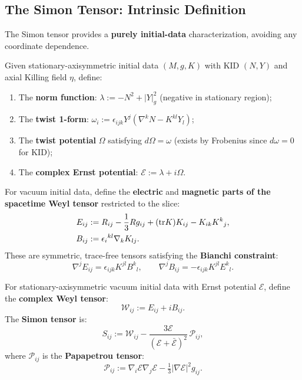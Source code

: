 \subsection{The Simon Tensor: Intrinsic Definition}

The Simon tensor provides a \textbf{purely initial-data} characterization, avoiding any coordinate dependence.

\begin{definition}\label{def:ernst-potentials}
Given stationary-axisymmetric initial data $(M, g, K)$ with KID $(N, Y)$ and axial Killing field $\eta$, define:
\begin{enumerate}
    \item The \textbf{norm function}: $\lambda := -N^2 + |Y|^2_g$ (negative in stationary region);
    \item The \textbf{twist 1-form}: $\omega_i := \epsilon_{ijk}Y^j(\nabla^k N - K^{kl}Y_l)$;
    \item The \textbf{twist potential} $\Omega$ satisfying $d\Omega = \omega$ (exists by Frobenius since $d\omega = 0$ for KID);
    \item The \textbf{complex Ernst potential}: $\mathcal{E} := \lambda + i\Omega$.
\end{enumerate}
\end{definition}

\begin{definition}\label{def:EB-weyl}
For vacuum initial data, define the \textbf{electric} and \textbf{magnetic parts of the spacetime Weyl tensor} restricted to the slice:
\begin{align}
E_{ij} &:= R_{ij} - \frac{1}{3}Rg_{ij} + (\mathrm{tr} K)K_{ij} - K_{ik}K^k{}_j, \label{eq:E-weyl}\\
B_{ij} &:= \epsilon_i{}^{kl}\nabla_k K_{lj}. \label{eq:B-weyl}
\end{align}
These are symmetric, trace-free tensors satisfying the \textbf{Bianchi constraint}:
\begin{equation}\label{eq:bianchi-system}
\nabla^j E_{ij} = \epsilon_{ijk}K^{jl}B^k{}_l, \qquad \nabla^j B_{ij} = -\epsilon_{ijk}K^{jl}E^k{}_l.
\end{equation}
\end{definition}

\begin{definition}\label{def:simon-tensor}
For stationary-axisymmetric vacuum initial data with Ernst potential $\mathcal{E}$, define the \textbf{complex Weyl tensor}:
\[
\mathcal{W}_{ij} := E_{ij} + iB_{ij}.
\]
The \textbf{Simon tensor} is:
\begin{equation}\label{eq:simon-tensor}
S_{ij} := \mathcal{W}_{ij} - \frac{3\mathcal{E}}{(\mathcal{E} + \bar{\mathcal{E}})^2}\,\mathcal{P}_{ij},
\end{equation}
where $\mathcal{P}_{ij}$ is the \textbf{Papapetrou tensor}:
\[
\mathcal{P}_{ij} := \nabla_i\mathcal{E}\nabla_j\mathcal{E} - \tfrac{1}{3}|\nabla\mathcal{E}|^2 g_{ij}.
\]
\end{definition}

